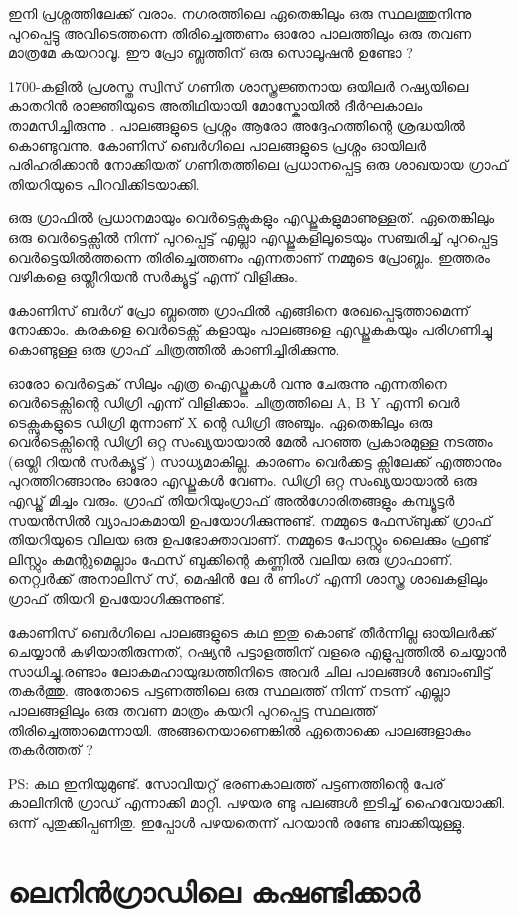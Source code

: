 \documentclass[10pt,a4paper]{report}
\begin{document}
ഇനി പ്രശ്നത്തിലേക്ക് വരാം. നഗരത്തിലെ ഏതെങ്കിലും ഒരു സ്ഥലത്തുനിന്നു പുറപ്പെട്ടു അവിടെത്തന്നെ തിരിച്ചെത്തണം ഓരോ പാലത്തിലും ഒരു തവണ മാത്രമേ കയറാവൂ. ഈ പ്രോ ബ്ലത്തിന് ഒരു സൊലൂഷൻ ഉണ്ടോ ?

1700-കളിൽ പ്രശസ്ത സ്വിസ് ഗണിത ശാസ്ത്രജ്ഞനായ ഒയിലർ റഷ്യയിലെ കാതറിൻ രാജ്ഞിയുടെ അതിഥിയായി മോസ്കോയിൽ ദീർഘകാലം താമസിച്ചിരുന്നു . പാലങ്ങളുടെ പ്രശ്നം ആരോ അദ്ദേഹത്തിന്റെ ശ്രദ്ധയിൽ കൊണ്ടുവന്നു. കോണിസ് ബെർഗിലെ പാലങ്ങളുടെ പ്രശ്നം ഓയിലർ പരിഹരിക്കാൻ നോക്കിയത് ഗണിതത്തിലെ പ്രധാനപ്പെട്ട ഒരു ശാഖയായ ഗ്രാഫ് തിയറിയുടെ പിറവിക്കിടയാക്കി.

ഒരു ഗ്രാഫിൽ പ്രധാനമായും വെർട്ടെക്സുകളും എഡ്ജുകളുമാണുള്ളത്. ഏതെങ്കിലും ഒരു വെർട്ടെക്സിൽ നിന്ന് പുറപ്പെട്ട് എല്ലാ എഡ്ജുകളിലൂടെയും സഞ്ചരിച്ച് പുറപ്പെട്ട വെർട്ടെയിൽത്തന്നെ തിരിച്ചെത്തണം എന്നതാണ് നമ്മുടെ പ്രോബ്ലം. ഇത്തരം വഴികളെ ഒയ്ലീറിയൻ സർക്യൂട്ട് എന്ന് വിളിക്കും.

കോണിസ് ബർഗ് പ്രോ ബ്ലത്തെ ഗ്രാഫിൽ എങ്ങിനെ രേഖപ്പെടുത്താമെന്ന് നോക്കാം. കരകളെ വെർടെക്സ് കളായും പാലങ്ങളെ എഡ്ജുകകയും പരിഗണിച്ചു കൊണ്ടുള്ള ഒരു ഗ്രാഫ് ചിത്രത്തിൽ കാണിച്ചിരിക്കുന്നു.

ഓരോ വെർട്ടെക് സിലും എത്ര ഐഡ്ജുകൾ വന്നു ചേരുന്നു എന്നതിനെ വെർടെക്സിന്റെ ഡിഗ്രി എന്ന് വിളിക്കാം. ചിത്രത്തിലെ A, B Y എന്നി വെർ ടെക്സുകളുടെ ഡിഗ്രി മുന്നാണ് X ന്റെ ഡിഗ്രി അഞ്ചും. ഏതെങ്കിലും ഒരു വെർടെക്സിന്റെ ഡിഗ്രി ഒറ്റ സംഖ്യയായാൽ മേൽ പറഞ്ഞ പ്രകാരമുള്ള നടത്തം (ഒയ്ലി റിയൻ സർക്യൂട്ട് ) സാധ്യമാകില്ല. കാരണം വെർക്കട്ട ക്സിലേക്ക് എത്താനും പുറത്തിറങ്ങാനും ഓരോ എഡ്ജുകൾ വേണം.
ഡിഗ്രി ഒറ്റ സംഖ്യയായാൽ ഒരു എഡ്ജ് മിച്ചം വരും.
ഗ്രാഫ് തിയറിയുംഗ്രാഫ് അൽഗോരിതങ്ങളും കമ്പ്യൂട്ടർ സയൻസിൽ വ്യാപാകമായി ഉപയോഗിക്കുന്നുണ്ട്.
നമ്മുടെ ഫേസ്ബുക്ക് ഗ്രാഫ് തിയറിയുടെ വിലയ ഒരു ഉപഭോക്താവാണ്. നമ്മുടെ പോസ്റ്റും ലൈക്കും ഫ്രണ്ട് ലിസ്റ്റും കമന്റുമെല്ലാം ഫേസ് ബുക്കിന്റെ കണ്ണിൽ വലിയ ഒരു ഗ്രാഫാണ്‌. നെറ്റ്വർക്ക് അനാലിസ് സ്, മെഷിൻ ലേ ർ ണിംഗ് എന്നി ശാസ്ത്ര ശാഖകളിലും ഗ്രാഫ് തിയറി ഉപയോഗിക്കുന്നുണ്ട്.

കോണിസ് ബെർഗിലെ പാലങ്ങളുടെ കഥ ഇതു കൊണ്ട് തീർന്നില്ല ഓയിലർക്ക് ചെയ്യാൻ കഴിയാതിരുന്നത്, റഷ്യൻ പട്ടാളത്തിന് വളരെ എളുപ്പത്തിൽ ചെയ്യാൻ സാധിച്ചു.രണ്ടാം ലോകമഹായുദ്ധത്തിനിടെ അവർ ചില പാലങ്ങൾ ബോംബിട്ട് തകർത്തു. അതോടെ പട്ടണത്തിലെ ഒരു സ്ഥലത്ത് നിന്ന് നടന്ന് എല്ലാ പാലങ്ങളിലും ഒരു തവണ മാത്രം കയറി പുറപ്പെട്ട സ്ഥലത്ത് തിരിച്ചെത്താമെന്നായി. അങ്ങനെയാണെങ്കിൽ ഏതൊക്കെ പാലങ്ങളാകും തകർത്തത് ?

PS: കഥ ഇനിയുമുണ്ട്. സോവിയറ്റ് ഭരണകാലത്ത് പട്ടണത്തിന്റെ പേര് കാലിനിൻ ഗ്രാഡ് എന്നാക്കി മാറ്റി. പഴയര ണ്ടു പലങ്ങൾ ഇടിച്ച് ഹൈവേയാക്കി. ഒന്ന് പുതുക്കിപ്പണിതു. ഇപ്പോൾ പഴയതെന്ന് പറയാൻ രണ്ടേ ബാക്കിയുള്ളു.  
  
  
  \section{ ലെനിൻഗ്രാഡിലെ കഷണ്ടിക്കാർ }
  
\end{document}
